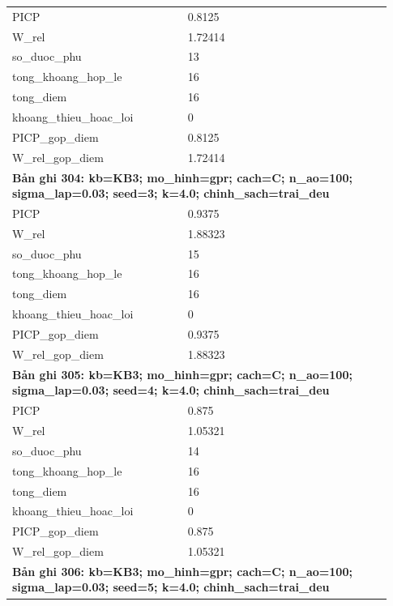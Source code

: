 \begin{longtable}{p{0.43\linewidth}p{0.50\linewidth}}
PICP & 0.8125 \\
W\_\allowbreak rel & 1.72414 \\
so\_\allowbreak duoc\_\allowbreak phu & 13 \\
tong\_\allowbreak khoang\_\allowbreak hop\_\allowbreak le & 16 \\
tong\_\allowbreak diem & 16 \\
khoang\_\allowbreak thieu\_\allowbreak hoac\_\allowbreak loi & 0 \\
PICP\_\allowbreak gop\_\allowbreak diem & 0.8125 \\
W\_\allowbreak rel\_\allowbreak gop\_\allowbreak diem & 1.72414 \\
\midrule
\multicolumn{2}{p{0.95\linewidth}}{\textbf{Bản ghi 304: kb=KB3; mo\_hinh=gpr; cach=C; n\_ao=100; sigma\_lap=0.03; seed=3; k=4.0; chinh\_sach=trai\_deu}} \\
PICP & 0.9375 \\
W\_\allowbreak rel & 1.88323 \\
so\_\allowbreak duoc\_\allowbreak phu & 15 \\
tong\_\allowbreak khoang\_\allowbreak hop\_\allowbreak le & 16 \\
tong\_\allowbreak diem & 16 \\
khoang\_\allowbreak thieu\_\allowbreak hoac\_\allowbreak loi & 0 \\
PICP\_\allowbreak gop\_\allowbreak diem & 0.9375 \\
W\_\allowbreak rel\_\allowbreak gop\_\allowbreak diem & 1.88323 \\
\midrule
\multicolumn{2}{p{0.95\linewidth}}{\textbf{Bản ghi 305: kb=KB3; mo\_hinh=gpr; cach=C; n\_ao=100; sigma\_lap=0.03; seed=4; k=4.0; chinh\_sach=trai\_deu}} \\
PICP & 0.875 \\
W\_\allowbreak rel & 1.05321 \\
so\_\allowbreak duoc\_\allowbreak phu & 14 \\
tong\_\allowbreak khoang\_\allowbreak hop\_\allowbreak le & 16 \\
tong\_\allowbreak diem & 16 \\
khoang\_\allowbreak thieu\_\allowbreak hoac\_\allowbreak loi & 0 \\
PICP\_\allowbreak gop\_\allowbreak diem & 0.875 \\
W\_\allowbreak rel\_\allowbreak gop\_\allowbreak diem & 1.05321 \\
\midrule
\multicolumn{2}{p{0.95\linewidth}}{\textbf{Bản ghi 306: kb=KB3; mo\_hinh=gpr; cach=C; n\_ao=100; sigma\_lap=0.03; seed=5; k=4.0; chinh\_sach=trai\_deu}} \\

\end{longtable}
